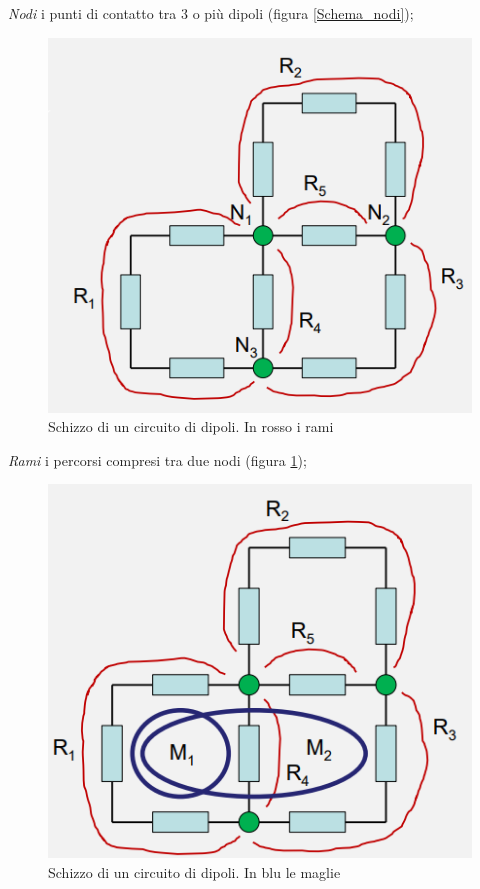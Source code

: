 \documentclass{article}
\begin{document}
\textit{Nodi} i punti di contatto tra 3 o più dipoli (figura \ref{Schema_nodi});

\begin{figure}[h]
  \centering
  \includegraphics[scale=0.4]{IM_kirchhoff_rami}
  \caption{Schizzo di un circuito di dipoli. In rosso i rami}
  \label{Schema_rami}
\end{figure}

\textit{Rami} i percorsi compresi tra due nodi (figura \ref{Schema_rami});

\begin{figure}[h]
  \centering
  \includegraphics[scale=0.4]{IM_kirchhoff_maglie}
  \caption{Schizzo di un circuito di dipoli. In blu le maglie}
  \label{Schema_maglie}
\end{figure}
\end{document}
